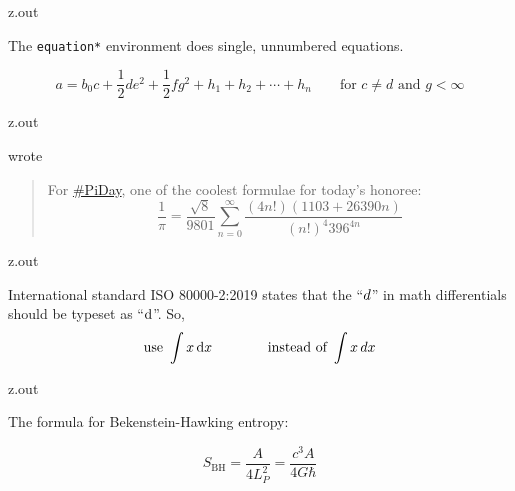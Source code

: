 \MyIO


\begin{VerbatimOut}{z.out}

The \verb+equation*+ environment does single, unnumbered equations.

\begin{equation*}
  a = b_0c + \frac12 de^2 + {\textstyle \frac12} fg^2
    + h_1 + h_2 + \cdots + h_n
    \qquad \text{for \(c \ne d\) and \(g < \infty\)}
\end{equation*}
\end{VerbatimOut}

\MyIO


\begin{VerbatimOut}{z.out}

\textcite{greene-2021-03-14}
wrote
\begin{quote}
  For
  \href{https://twitter.com/hashtag/PiDay?src=hashtag\_click\#PiDay}{\#PiDay},
  one of the coolest formulae for today's honoree:
  \[
    \frac 1\pi
    =
    \frac {\sqrt8} {9801}
    \sum_{n=0}^\infty
    \frac  {(4n!) (1103+26390n)}  {(n!)^4 396^{4n}}
  \]
\end{quote}
\end{VerbatimOut}

\MyIO


\begin{VerbatimOut}{z.out}

International standard ISO 80000-2:2019
\cite{iso8000022019}
states that the ``$d\/$'' in math differentials
should be typeset as ``$\di$''.
So,
\begin{equation*}
  \text{use } \int x\di x\qquad\qquad \text{instead of } \int x\,dx
\end{equation*}
\end{VerbatimOut}

\MyIO


\begin{VerbatimOut}{z.out}

The formula for Bekenstein-Hawking entropy:

\begin{equation*}
  S_\text{BH}
  =
  \frac A {4L_P^2}
  = \frac {c^3A} {4G\hbar}
\end{equation*}
\end{VerbatimOut}

\MyIO


